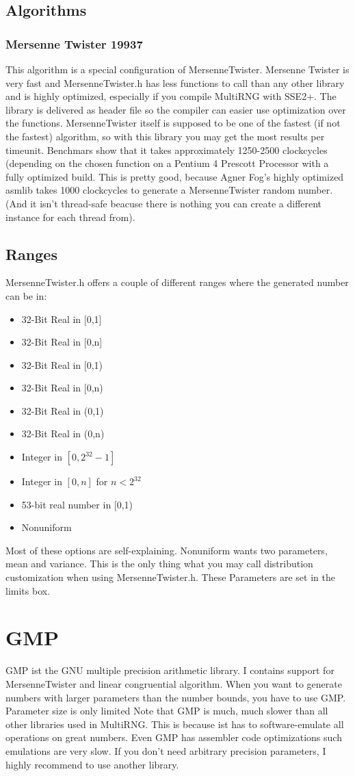 \documentclass{scrartcl}
\begin{document}
\subsection{Algorithms}
\subsubsection{Mersenne Twister 19937}
This algorithm is a special configuration of MersenneTwister. Mersenne Twister is very fast and MersenneTwister.h has less functions to call than any other library and is highly optimized, especially if you compile MultiRNG with SSE2+. The library is delivered as header file so the compiler can easier use optimization over the functions. MersenneTwister itself is supposed to be one of the fastest (if not the fastest) algorithm, so with this library you may get the most results per timeunit. Benchmars show that it takes approximately 1250-2500 clockcycles (depending on the chosen function on a Pentium 4 Prescott Processor with a fully optimized build. This is pretty good, because Agner Fog's highly optimized asmlib takes 1000 clockcycles to generate a MersenneTwister random number. (And it isn't thread-safe beacuse there is nothing you can create a different instance for each thread from).
\subsection{Ranges}
MersenneTwister.h offers a couple of different ranges where the generated number can be in:
\begin{itemize}
	\item 32-Bit Real in [0,1]
	\item 32-Bit Real in [0,n]
	\item 32-Bit Real in [0,1)
	\item 32-Bit Real in [0,n)
	\item 32-Bit Real in (0,1)
	\item 32-Bit Real in (0,n)
	\item Integer in $[0,2^32-1]$
	\item Integer in $[0,n]$ for $n<2^{32}$
	\item 53-bit real number in [0,1)
	\item Nonuniform
\end{itemize}
Most of these options are self-explaining. Nonuniform wants two parameters, mean and variance. This is the only thing what you may call distribution customization when using MersenneTwister.h. These Parameters are set in the limits box.
\section{GMP}
GMP ist the GNU multiple precision arithmetic library. I contains support for MersenneTwister and linear congruential algorithm. When you want to generate numbers with larger parameters than the number bounds, you have to use GMP. Parameter size is only limited Note that GMP is much, much slower than all other libraries used in MultiRNG. This is because ist has to software-emulate all operations on great numbers. Even GMP has assembler code optimizations such emulations are very slow. If you don't need arbitrary precision parameters, I highly recommend to use another library.
\end{document}
